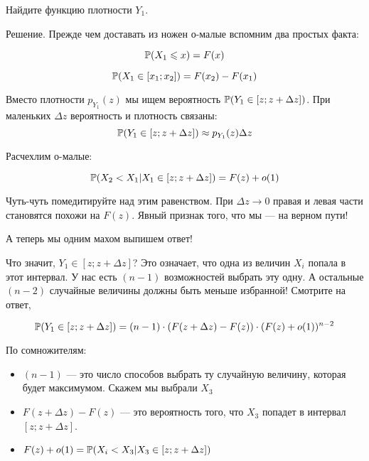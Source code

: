 \begin{myex} Найдите функцию плотности $ Y_{1} $.

Решение. Прежде чем доставать из ножен о-малые вспомним два простых факта:

\begin{equation}
\P(X_{1}\leq x)=F(x)
\end{equation}

\begin{equation}
\P(X_{1}\in [x_{1};x_{2}])=F(x_{2})-F(x_{1})
\end{equation}



Вместо плотности $ p_{Y_{1}}(z) $ мы ищем вероятность $ \P(Y_{1}\in [z;z+\Delta z]) $. При маленьких $ \Delta z $ вероятность и плотность связаны:
\begin{equation}
\P(Y_{1}\in [z;z+\Delta z])\approx p_{Y_{1}}(z)\Delta z
\end{equation}


Расчехлим о-малые:

\begin{equation}
\P(X_{2}<X_{1}|X_{1}\in [z;z+\Delta z])=F(z)+o(1)
\end{equation}

Чуть-чуть помедитируйте над этим равенством. При $ \Delta z\to 0 $ правая и левая части становятся похожи на $ F(z) $. Явный признак того, что мы — на верном пути!

А теперь мы одним махом выпишем ответ!

Что значит, $ Y_{1}\in [z;z+\Delta z] $? Это означает, что одна из величин $ X_{i} $ попала в этот интервал. У нас есть $ (n-1) $ возможностей выбрать эту одну. А остальные $ (n-2) $ случайные величины должны быть меньше избранной! Смотрите на ответ,

\begin{equation}
\P(Y_{1}\in [z;z+\Delta z])=(n-1)\cdot (F(z+\Delta z)-F(z)) \cdot (F(z)+o(1))^{n-2}
\end{equation}

По сомножителям:
\begin{itemize}
\item $ (n-1) $ — это число способов выбрать ту случайную величину, которая будет максимумом. Скажем мы выбрали $ X_{3} $
\item $ F(z+\Delta z)-F(z) $ — это вероятность того, что $ X_{3} $ попадет в интервал $ [z;z+\Delta z] $.
\item $ F(z)+o(1)=\P(X_{i}<X_{3}|X_{3}\in [z;z+\Delta z]) $
\end{itemize}


\end{myex}
